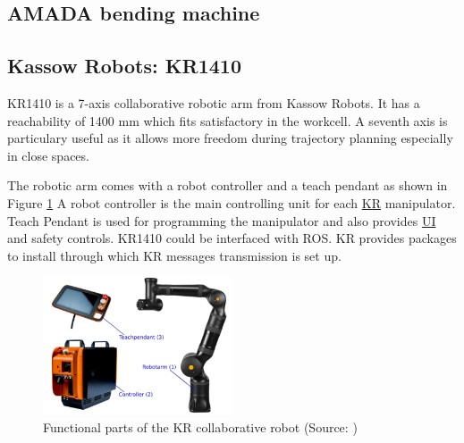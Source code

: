 \subsection{AMADA bending machine}


\subsection{Kassow Robots: KR1410}

KR1410 is a 7-axis collaborative robotic arm from Kassow Robots. It has a reachability of 1400 mm which fits
satisfactory in the workcell. A seventh axis is particulary useful as it allows more freedom during trajectory planning
especially in close spaces.

The robotic arm comes with a robot controller and a teach pendant as shown in Figure \ref{fig:kassow-robot-parts} A robot controller is the main controlling unit for each \hyperref[acro:KR]{KR} manipulator.
Teach Pendant is used for programming the manipulator and also provides \hyperref[acro:UI]{UI} and safety controls.
KR1410 could be interfaced with ROS. KR provides packages to install through which KR messages transmission is set up.

\begin{figure}[h]
    \centering
    \includegraphics[width=0.5\textwidth]{figures/kassow-robot-parts.png}
    \caption{Functional parts of the KR collaborative robot (Source: \cite{kassow-manual})}
    \label{fig:kassow-robot-parts}
\end{figure}

